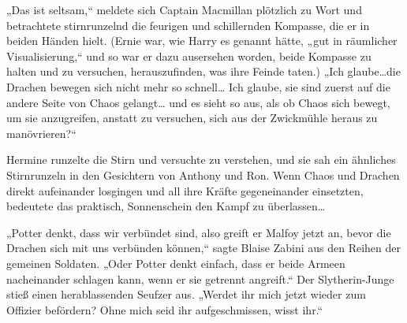 „Das ist seltsam,“ meldete sich Captain Macmillan plötzlich zu Wort und betrachtete stirnrunzelnd die feurigen und schillernden Kompasse, die er in beiden Händen hielt. (Ernie war, wie Harry es genannt hätte, „gut in räumlicher Visualisierung,“ und so war er dazu ausersehen worden, beide Kompasse zu halten und zu versuchen, herauszufinden, was ihre Feinde taten.) „Ich glaube…die Drachen bewegen sich nicht mehr so schnell… Ich glaube, sie sind zuerst auf die andere Seite von Chaos gelangt… und es sieht so aus, als ob Chaos sich bewegt, um sie anzugreifen, anstatt zu versuchen, sich aus der Zwickmühle heraus zu manövrieren?“

Hermine runzelte die Stirn und versuchte zu verstehen, und sie sah ein ähnliches Stirnrunzeln in den Gesichtern von Anthony und Ron. Wenn Chaos und Drachen direkt aufeinander losgingen und all ihre Kräfte gegeneinander einsetzten, bedeutete das praktisch, Sonnenschein den Kampf zu überlassen…

„Potter denkt, dass wir verbündet sind, also greift er Malfoy jetzt an, bevor die Drachen sich mit uns verbünden können,“ sagte Blaise Zabini aus den Reihen der gemeinen Soldaten. „Oder Potter denkt einfach, dass er beide Armeen nacheinander schlagen kann, wenn er sie getrennt angreift.“ Der Slytherin-Junge stieß einen herablassenden Seufzer aus. „Werdet ihr mich jetzt wieder zum Offizier befördern? Ohne mich seid ihr aufgeschmissen, wisst ihr.“

